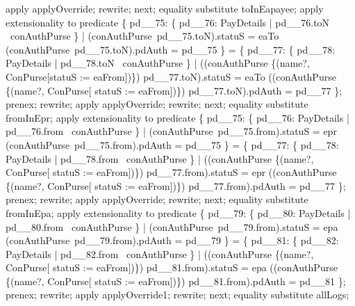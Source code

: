 \begin{LPScript}
\begin{zproof}[lPromotedAuxWorldAckType]
        apply applyOverride;
        rewrite;
    next;
        equality substitute toInEapayee;
        apply extensionality to predicate
            \{ pd\_\_75: \{ pd\_\_76: PayDetails | pd\_\_76.toN \in \dom~conAuthPurse \}
              | (conAuthPurse~pd\_\_75.toN).statuS = eaTo
              \land (conAuthPurse~pd\_\_75.toN).pdAuth = pd\_\_75 \}
            = \{ pd\_\_77: \{ pd\_\_78: PayDetails | pd\_\_78.toN \in \dom~conAuthPurse \}
                | ((conAuthPurse \oplus \{(name?, \theta ConPurse[statuS := eaFrom])\})
                    pd\_\_77.toN).statuS = eaTo
                \land ((conAuthPurse \oplus \{(name?, \theta ConPurse[
                    statuS := eaFrom])\}) pd\_\_77.toN).pdAuth = pd\_\_77 \};
        prenex;
        rewrite;
        apply applyOverride;
        rewrite;
    next;
        equality substitute fromInEpr;
        apply extensionality to predicate
            \{ pd\_\_75: \{ pd\_\_76: PayDetails | pd\_\_76.from \in \dom~conAuthPurse \}
                | (conAuthPurse~pd\_\_75.from).statuS = epr
                \land (conAuthPurse~pd\_\_75.from).pdAuth = pd\_\_75 \}
            = \{ pd\_\_77: \{ pd\_\_78: PayDetails | pd\_\_78.from \in \dom~conAuthPurse \}
                | ((conAuthPurse \oplus \{(name?, \theta ConPurse[
                    statuS := eaFrom])\}) pd\_\_77.from).statuS = epr
             \land ((conAuthPurse \oplus \{(name?, \theta ConPurse[
                    statuS := eaFrom])\}) pd\_\_77.from).pdAuth = pd\_\_77 \};
        prenex;
        rewrite;
        apply applyOverride;
        rewrite;
    next;
        equality substitute fromInEpa;
        apply extensionality to predicate
            \{ pd\_\_79: \{ pd\_\_80: PayDetails | pd\_\_80.from \in \dom~conAuthPurse \}
                | (conAuthPurse~pd\_\_79.from).statuS = epa
                \land (conAuthPurse~pd\_\_79.from).pdAuth = pd\_\_79 \}
            = \{ pd\_\_81: \{ pd\_\_82: PayDetails | pd\_\_82.from \in \dom~conAuthPurse \}
                | ((conAuthPurse \oplus \{(name?, \theta ConPurse[
                    statuS := eaFrom])\}) pd\_\_81.from).statuS = epa
                \land ((conAuthPurse \oplus \{(name?, \theta ConPurse[
                    statuS := eaFrom])\}) pd\_\_81.from).pdAuth = pd\_\_81 \};
        prenex;
        rewrite;
        apply applyOverride1;
        rewrite;
    next;
        equality substitute allLogs;

\end{zproof}
\end{LPScript}
